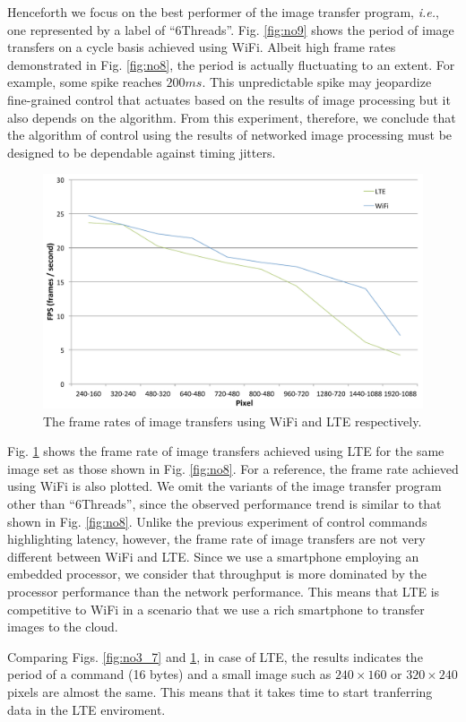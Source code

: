 Henceforth we focus on the best performer of the image transfer program,
\textit{i.e.}, one represented by a label of ``6Threads''.
Fig. \ref{fig:no9} shows the period of image transfers on a cycle basis
achieved using WiFi.
Albeit high frame rates demonstrated in Fig. \ref{fig:no8}, the period is
actually fluctuating to an extent.
For example, some spike reaches $200ms$.
This unpredictable spike may jeopardize fine-grained control that actuates
based on the results of image processing but it also depends on the
algorithm.
From this experiment, therefore, we conclude that the algorithm of
control using the results of networked image processing must be designed
to be dependable against timing jitters.

\begin{figure}[!t]
 \centering
 \includegraphics[width=0.8\hsize]{fig/No10_TIPiC_FPS_graph_LTE.pdf}
 \caption{The frame rates of image transfers using WiFi and LTE
 respectively.}
 \label{fig:no10}
\end{figure}

Fig. \ref{fig:no10} shows the frame rate of image transfers achieved
using LTE for the same image set as those shown in Fig. \ref{fig:no8}.
For a reference, the frame rate achieved using WiFi is also plotted.
We omit the variants of the image transfer program other than
``6Threads'', since the observed performance trend is similar to that
shown in Fig. \ref{fig:no8}.
Unlike the previous experiment of control commands highlighting latency,
however, the frame rate of image transfers are not very different
between WiFi and LTE.
Since we use a smartphone employing an embedded processor, we consider
that throughput is more dominated by the processor performance than the
network performance.
This means that LTE is competitive to WiFi in a scenario that we use a
rich smartphone to transfer images to the cloud.

Comparing Figs. \ref{fig:no3_7} and \ref{fig:no10}, in case of LTE,
the results indicates the period of a command (16 bytes) and a small image such as $240\times160$ or $320\times240$ pixels are almost the same.
This means that it takes time to start tranferring data in the LTE enviroment.

